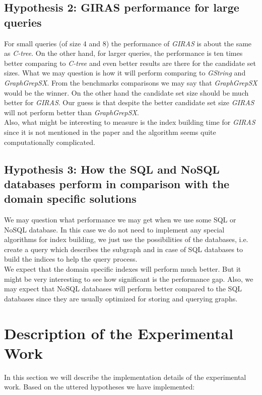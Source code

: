 \subsection{Hypothesis 2: GIRAS performance for large queries}

For small queries (of size 4 and 8) the performance of \textit{GIRAS} is about the same as \textit{C-tree}. On the other hand, for larger queries, the performance is ten times better comparing to \textit{C-tree} and even better results are there for the candidate set sizes. What we may question is how it will perform comparing to \textit{GString} and \textit{GraphGrepSX}. From the benchmarks comparisons we may say that \textit{GraphGrepSX} would be the winner. On the other hand the candidate set size should be much better for \textit{GIRAS}. Our guess is that despite the better candidate set size \textit{GIRAS} will not perform better than \textit{GraphGrepSX}.\\

Also, what might be interesting to measure is the index building time for \textit{GIRAS} since it is not mentioned in the paper and the algorithm seems quite computationally complicated.

\subsection{Hypothesis 3: How the SQL and NoSQL databases perform in comparison with the domain specific solutions}

We may question what performance we may get when we use some SQL or NoSQL database. In this case we do not need to implement any special algorithms for index building, we just use the possibilities of the databases, i.e. create a query which describes the subgraph and in case of SQL databases to build the indices to help the query process.\\

We expect that the domain specific indexes will perform much better. But it might be very interesting to see how significant is the performance gap. Also, we may expect that NoSQL databases will perform better compared to the SQL databases since they are usually optimized for storing and querying graphs.

\section{Description of the Experimental Work}

In this section we will describe the implementation details of the experimental work. Based on the uttered hypotheses we have implemented:

